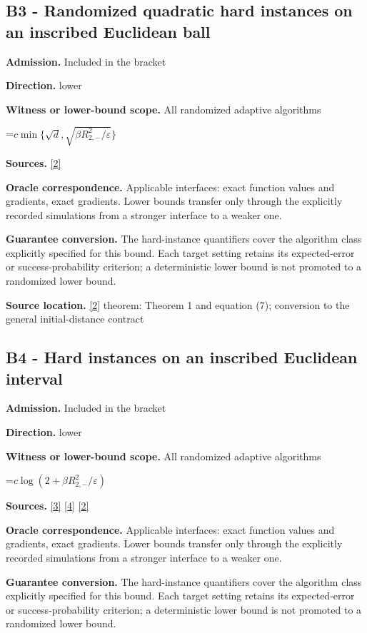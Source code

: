 \documentclass[10pt,a4paper]{article}
\newcommand{\AtlasMath}[1]{\par\begingroup\centering\setbox0=\hbox{$\displaystyle #1$}\ifdim\wd0>1.4\linewidth\typeout{ATLAS WIDE FORMULA: \the\wd0}\fi\ifdim\wd0>\linewidth\resizebox{\linewidth}{!}{\box0}\else\box0\fi\par\endgroup}
\begin{document}
\subsection{B3 - Randomized quadratic hard instances on an inscribed Euclidean ball}
\textbf{Admission.} Included in the bracket

\textbf{Direction.} lower

\textbf{Witness or lower-bound scope.} All randomized adaptive algorithms

\AtlasMath{c\min\{\sqrt d,\sqrt{\beta R_{2,-}^2/\varepsilon}\}}
\textbf{Sources.} \href{https://arxiv.org/pdf/2609.10874}{[2]}

\textbf{Oracle correspondence.} Applicable interfaces: exact function values and gradients, exact gradients. Lower bounds transfer only through the explicitly recorded simulations from a stronger interface to a weaker one.

\textbf{Guarantee conversion.} The hard-instance quantifiers cover the algorithm class explicitly specified for this bound. Each target setting retains its expected-error or success-probability criterion; a deterministic lower bound is not promoted to a randomized lower bound.

\textbf{Source location.} \href{https://arxiv.org/pdf/2609.10874}{[2]} theorem: Theorem 1 and equation (7); conversion to the general initial-distance contract

\subsection{B4 - Hard instances on an inscribed Euclidean interval}
\textbf{Admission.} Included in the bracket

\textbf{Direction.} lower

\textbf{Witness or lower-bound scope.} All randomized adaptive algorithms

\AtlasMath{c\log(2+\beta R_{2,-}^2/\varepsilon)}
\textbf{Sources.} \href{https://arxiv.org/pdf/2101.09740v2}{[3]} \href{https://arxiv.org/pdf/2609.33360v2}{[4]} \href{https://arxiv.org/pdf/2609.10874}{[2]}

\textbf{Oracle correspondence.} Applicable interfaces: exact function values and gradients, exact gradients. Lower bounds transfer only through the explicitly recorded simulations from a stronger interface to a weaker one.

\textbf{Guarantee conversion.} The hard-instance quantifiers cover the algorithm class explicitly specified for this bound. Each target setting retains its expected-error or success-probability criterion; a deterministic lower bound is not promoted to a randomized lower bound.
\end{document}
